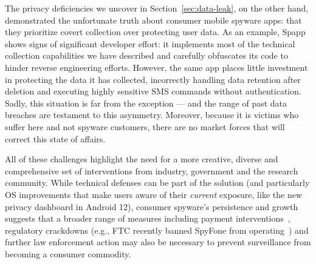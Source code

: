 \documentclass[sigconf,balance=false]{acmart}
\begin{document}
The privacy deficiencies we uncover in Section~\ref{sec:data-leak}, on
the other hand, demonstrated the unfortunate truth about consumer
mobile spyware apps: that they prioritize covert collection over
protecting user data.  As an example, Spapp shows signs of
significant developer effort: it implements most of the technical
collection capabilities we have described and carefully obfuscates its
code to hinder reverse engineering efforts. However, the same app
places little investment in protecting the data it has collected,
incorrectly handling data retention after deletion and executing
highly sensitive SMS commands without authentication.  Sadly, this
situation is far from the exception --- and the range of past data
breaches are testament to this asymmetry.  Moreover, because it is
victims who suffer here and not spyware customers, there are no market
forces that will correct this state of affairs.

All of these challenges highlight the need for a more creative,
diverse and comprehensive set of interventions from industry,
government and the research community.  While technical defenses can
be part of the solution (and particularly OS improvements that make
users aware of their \emph{current} exposure, like the new privacy
dashboard in Android 12), consumer spyware's persistence and growth
suggests that a broader range of measures including payment
interventions~\cite{mccoy2012priceless}, regulatory crackdowns (e.g., FTC
recently banned SpyFone from operating~\cite{FTCFinal26:online}) and
further law enforcement action may also be necessary to prevent
surveillance from becoming a consumer commodity.



\end{document}
